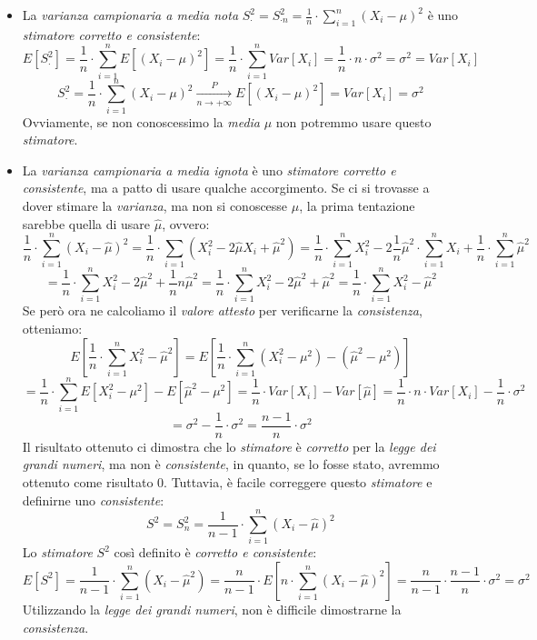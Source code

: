 \documentclass[12pt, a4paper]{report}
\theoremstyle{definition}
\newcommand\conv[2]{\xrightarrow[#2\to +\infty]{#1}}
\begin{document}
\begin{itemize}
	\item La \emph{varianza campionaria a media nota} \(S^2_\cdot =S^2_{\cdot n}=\frac{1}{n}
	\cdot \sum_{i=1}^n(X_i-\mu)^2\) è uno \emph{stimatore corretto e consistente}:
	\[E[S^2_\cdot ]=\frac{1}{n}\cdot \sum_{i=1}^nE[(X_i-\mu)^2]=\frac{1}{n}\cdot \sum_{i=1}^n
	Var[X_i]=\frac{1}{n}\cdot n\cdot \sigma^2=\sigma^2=Var[X_i]\]
	\[S^2_\cdot =\frac{1}{n}\cdot \sum_{i=1}^n(X_i-\mu)^2\conv{P}{n}E[(X_i-\mu)^2]=Var[X_i]
	=\sigma^2\]
	Ovviamente, se non conoscessimo la \emph{media} $\mu$ non potremmo usare questo
	\emph{stimatore}.
	\item La \emph{varianza campionaria a media ignota} è uno \emph{stimatore
	corretto e consistente}, ma a patto di usare qualche accorgimento. Se ci
	si trovasse a dover stimare la \emph{varianza}, ma non si conoscesse $\mu$,
	la prima tentazione sarebbe quella di usare $\hat{\mu}$, ovvero:
	\[\frac{1}{n}\cdot \sum_{i=1}^n(X_i-\hat{\mu})^2=\frac{1}{n}\cdot \sum_{i=1}(X_i^2-
	2\hat{\mu}X_i+\hat{\mu}^2)=\frac{1}{n}\cdot \sum_{i=1}^nX_i^2-2\frac{1}{n}\hat{\mu}^2
	\cdot \sum_{i=1}^nX_i+\frac{1}{n}\cdot \sum_{i=1}^n\hat{\mu}^2\]
	\[=\frac{1}{n}\cdot \sum_{i=1}^nX_i^2-2\hat{\mu}^2+\frac{1}{n}n\hat{\mu}^2=
	\frac{1}{n}\cdot \sum_{i=1}^nX_i^2-2\hat{\mu}^2+\hat{\mu}^2=\frac{1}{n}\cdot \sum_{i=1}
	^nX_i^2-\hat{\mu}^2\]
	Se però ora ne calcoliamo il \emph{valore attesto} per verificarne la
	\emph{consistenza}, otteniamo:
	\[E\left[\frac{1}{n}\cdot \sum_{i=1}^nX_i^2-\hat{\mu}^2\right]=E\left[\frac{1}{n}\cdot \sum_{i=1}^n(
	X_i^2-\mu^2)-(\hat{\mu}^2-\mu^2)\right]\]
	\[=\frac{1}{n}\cdot \sum_{i=1}^nE[X_i^2-\mu^2]-E[\hat{\mu}^2-\mu^2]
	=\frac{1}{n}\cdot Var[X_i]-Var[\hat{\mu}]=\frac{1}{n}\cdot n\cdot Var[X_i]-\frac{1}{n}
	\cdot \sigma^2\]
	\[=\sigma^2-\frac{1}{n}\cdot \sigma^2=\frac{n-1}{n}\cdot \sigma^2\]
	Il risultato ottenuto ci dimostra che lo \emph{stimatore} è \emph{corretto}
	per la \emph{legge dei grandi numeri}, ma non è \emph{consistente}, in quanto,
	se lo fosse stato, avremmo ottenuto come risultato $0$. Tuttavia, è facile
	correggere questo \emph{stimatore} e definirne uno \emph{consistente}:
	\[S^2=S^2_n=\frac{1}{n-1}\cdot \sum_{i=1}^n(X_i-\hat{\mu})^2\]
	Lo \emph{stimatore} $S^2$ così definito è \emph{corretto e consistente}:
	\[E[S^2]=\frac{1}{n-1}\cdot \sum_{i=1}^n(X_i-\hat{\mu}^2)=\frac{n}{n-1}\cdot E\left[
	n\cdot \sum_{i=1}^n(X_i-\hat{\mu})^2\right]=\frac{n}{n-1}\cdot \frac{n-1}{n}\cdot \sigma^2=\sigma^2\]
	Utilizzando la \emph{legge dei grandi numeri}, non è difficile dimostrarne la
	\emph{consistenza}.
\end{itemize}
\end{document}

